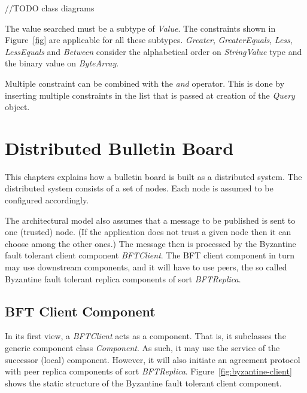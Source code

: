 \documentclass[oneside]{scrreprt}
\newcommand{\fig}[1]{Figure~\ref{#1}}
\begin{document}
//TODO class diagrams

The value searched must be a subtype of \emph{Value}. The constraints shown in \fig{fig} are applicable for all these subtypes. \emph{Greater}, \emph{GreaterEquals}, \emph{Less}, \emph{LessEquals} and \emph{Between} consider the alphabetical order on \emph{StringValue} type and the binary value on \emph{ByteArray}.

Multiple constraint can be combined with the \emph{and} operator. This is done by inserting multiple constraints in the list that is passed at creation of the \emph{Query} object.
 

\chapter{Distributed Bulletin Board}

This chapters explains how a bulletin board is built as
a distributed system. The distributed system consists of
a set of nodes. Each node is assumed to be configured
accordingly.

The architectural model also assumes that a message to
be published is sent to one (trusted) node. (If the
application does not trust a given node then it can
choose among the other ones.) The message then is
processed by the Byzantine fault tolerant client
component \emph{BFTClient}. The BFT client component in turn
may use downstream components, and it will have
to use peers, the so called Byzantine fault tolerant
replica components of sort \emph{BFTReplica}.


\section{BFT Client Component}

In its first view, a \emph{BFTClient} acts as a component.
That is, it subclasses the generic component class
\emph{Component}. As such, it may use the service of
the successor (local) component. However, it will also
initiate an agreement protocol with peer replica
components of sort \emph{BFTReplica}. \fig{fig:byzantine-client}
shows the static structure of the Byzantine fault tolerant client
component.
\end{document}
